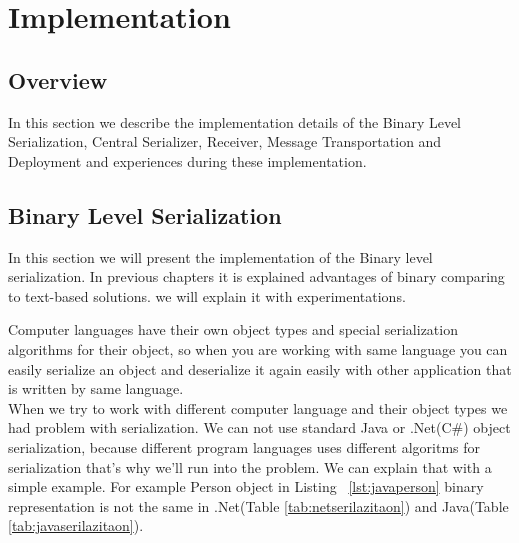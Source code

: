 

\chapter{Implementation}
\label{chapter:implementation}

\section{Overview}
\label{section:overview}

In this section we describe the implementation details of the Binary Level Serialization, Central Serializer, Receiver, Message Transportation and Deployment and experiences during these implementation.
\section{Binary Level Serialization}
\label{section:binaryLevelSerialization}

In this section we will present the implementation of the Binary level serialization. In previous chapters it is explained advantages of binary comparing to text-based solutions. we will explain it with experimentations.

Computer languages have their own object types and special serialization algorithms for their object, so when you are working with same language you can easily serialize an object and deserialize it again easily with other application that is written by same language.\\

When we try to work with different computer language and their object types we had problem with serialization.
We can not use standard Java or .Net(C\#) object serialization, because different program languages uses different algoritms for serialization that's why we’ll run into the problem. We can explain that with a simple example. For example Person object in Listing ~\ref{lst:javaperson} binary representation is not the same in .Net(Table \ref{tab:netserilazitaon}) and Java(Table \ref{tab:javaserilazitaon}).

